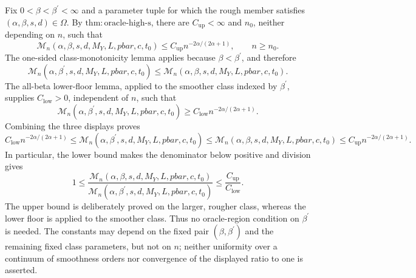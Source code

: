 Fix \(0<\beta<\beta^{\prime}<\infty\) and a parameter tuple for which the rough member satisfies \((\alpha,\beta,s,d)\in\Omega\). By \(\mathrm{thm:oracle\text{-}high\text{-}s}\), there are \(C_{\mathrm{up}}<\infty\) and \(n_0\), neither depending on \(n\), such that
\[
\mathcal M_n(\alpha,\beta,s,d,M_Y,L,pbar,c,t_0)
\le C_{\mathrm{up}}n^{-2\alpha/(2\alpha+1)},\qquad n\ge n_0.
\]
The one-sided class-monotonicity lemma applies because \(\beta<\beta^{\prime}\), and therefore
\[
\mathcal M_n(\alpha,\beta^{\prime},s,d,M_Y,L,pbar,c,t_0)
\le
\mathcal M_n(\alpha,\beta,s,d,M_Y,L,pbar,c,t_0).
\]
The all-beta lower-floor lemma, applied to the smoother class indexed by \(\beta^{\prime}\), supplies \(C_{\mathrm{low}}>0\), independent of \(n\), such that
\[
\mathcal M_n(\alpha,\beta^{\prime},s,d,M_Y,L,pbar,c,t_0)
\ge C_{\mathrm{low}}n^{-2\alpha/(2\alpha+1)}.
\]
Combining the three displays proves
\[
C_{\mathrm{low}}n^{-2\alpha/(2\alpha+1)}
\le
\mathcal M_n(\alpha,\beta^{\prime},s,d,M_Y,L,pbar,c,t_0)
\le
\mathcal M_n(\alpha,\beta,s,d,M_Y,L,pbar,c,t_0)
\le
C_{\mathrm{up}}n^{-2\alpha/(2\alpha+1)}.
\]
In particular, the lower bound makes the denominator below positive and division gives
\[
1\le
\frac{\mathcal M_n(\alpha,\beta,s,d,M_Y,L,pbar,c,t_0)}
{\mathcal M_n(\alpha,\beta^{\prime},s,d,M_Y,L,pbar,c,t_0)}
\le \frac{C_{\mathrm{up}}}{C_{\mathrm{low}}}.
\]
The upper bound is deliberately proved on the larger, rougher class, whereas the lower floor is applied to the smoother class. Thus no oracle-region condition on \(\beta^{\prime}\) is needed. The constants may depend on the fixed pair \((\beta,\beta^{\prime})\) and the remaining fixed class parameters, but not on \(n\); neither uniformity over a continuum of smoothness orders nor convergence of the displayed ratio to one is asserted.